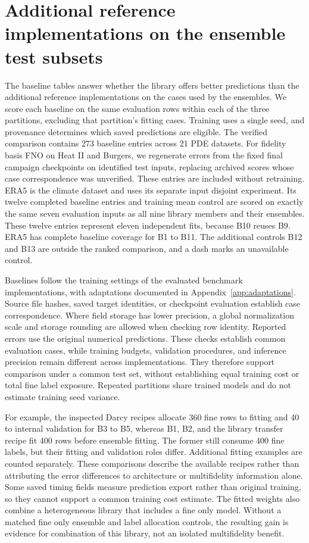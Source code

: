 \clearpage
\section{Additional reference implementations on the ensemble test subsets}
\label{app:matchedbaselines}
The baseline tables answer whether the library offers better predictions than
the additional reference implementations on the cases used by the ensembles.
We score each baseline on the same evaluation rows within each of the three
partitions, excluding that partition's fitting cases. Training uses a
single seed, and provenance determines which saved predictions are eligible.
The verified comparison contains 273 baseline entries across 21 PDE datasets.
For fidelity basis FNO on Heat II and Burgers, we regenerate errors from the
fixed final campaign checkpoints on identified test inputs, replacing archived
scores whose case correspondence was unverified. These entries are included
without retraining. ERA5 is the climate dataset
and uses its separate input disjoint experiment. Its twelve completed baseline
entries and training mean control are scored on exactly the same seven evaluation
inputs as all nine library members and their ensembles. These twelve entries
represent eleven independent fits, because B10 reuses B9. ERA5 has complete
baseline coverage for B1 to B11. The additional controls B12 and B13 are outside
the ranked comparison, and a dash marks an unavailable control.

Baselines follow the training settings of the evaluated benchmark implementations,
with adaptations documented in Appendix~\ref{app:adaptations}.
Source file hashes, saved target identities, or checkpoint evaluation establish case correspondence.
Where field storage has lower precision, a global normalization scale and
storage rounding are allowed when checking row identity. Reported errors use
the original numerical predictions. These checks establish common evaluation
cases, while training budgets, validation procedures, and inference precision
remain different across implementations. They therefore support comparison
under a common test set, without establishing equal training cost or total
fine label exposure. Repeated partitions share trained models and do not
estimate training seed variance.

For example, the inspected Darcy recipes allocate 360 fine rows to fitting and
40 to internal validation for B3 to B5, whereas B1, B2, and the library transfer
recipe fit 400 rows before ensemble fitting. The former still consume 400
fine labels, but their fitting and validation roles differ. Additional
fitting examples are counted separately. These comparisons describe the
available recipes rather than attributing the error differences to architecture
or multifidelity information alone. Some saved timing fields measure prediction
export rather than original training, so they cannot support a common training
cost estimate. The fitted weights also combine a heterogeneous library that
includes a fine only model. Without a matched fine only ensemble and label
allocation controls, the resulting gain is evidence for combination of this
library, not an isolated multifidelity benefit.

